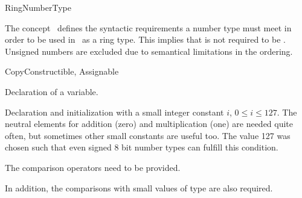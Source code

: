 \begin{ccRefConcept}{RingNumberType}

\ccDefinition

The concept \ccRefName\ defines the syntactic requirements a number type must
meet in order to be used in \cgal\ as a ring type.  This implies that
 is not required
to be . Unsigned numbers are excluded due to
semantical limitations in the ordering.

\ccRefines

CopyConstructible, Assignable 


\ccSetTwoColumns{}{\hspace*{8.5cm}}
\ccCreation
{}

            {Declaration of a variable.}

            {Declaration and initialization with a small integer
constant $i$, $0 \leq i \leq 127$. The neutral elements for addition
(zero) and multiplication (one) are needed quite often, but sometimes
other small constants are useful too. The value 127 was chosen such
that even signed 8 bit number types can fulfill this condition.}

\ccOperations

The comparison operators need to be provided.

 {}
\ccGlue
{} {}
\ccGlue
{} {}
\ccGlue
{} {}
\ccGlue
{} {}
\ccGlue
{} {}

In addition, the comparisons with small values of type  are also
required.


\end{ccRefConcept}
